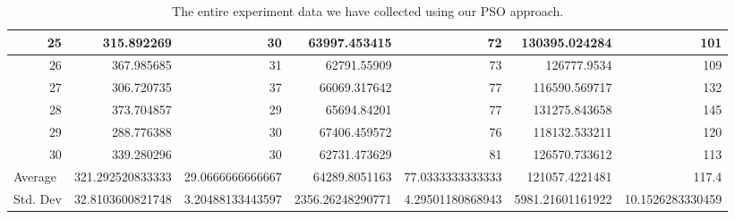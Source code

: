 \begin{table}
\begin{adjustwidth}{}{}
{{\begin{tabular}{|r|r|r|r|r|r|r|}
\hline
25                                         & 315.892269                   & 30                                    & 63997.453415                   & 72                                    & 130395.024284                & 101                                    \\ 
\hline
26                                         & 367.985685                   & 31                                    & 62791.55909                    & 73                                    & 126777.9534                  & 109                                    \\ 
\hline
27                                         & 306.720735                   & 37                                    & 66069.317642                   & 77                                    & 116590.569717                & 132                                    \\ 
\hline
28                                         & 373.704857                   & 29                                    & 65694.84201                    & 77                                    & 131275.843658                & 145                                    \\ 
\hline
29                                         & 288.776388                   & 30                                    & 67406.459572                   & 76                                    & 118132.533211                & 120                                    \\ 
\hline
30                                         & 339.280296                   & 30                                    & 62731.473629                   & 81                                    & 126570.733612                & 113                                    \\ 
\hline
\multicolumn{1}{|l|}{Average}              & 321.292520833333             & 29.0666666666667                      & 64289.8051163                  & 77.0333333333333                      & 121057.4221481               & 117.4                                  \\ 
\hline
\multicolumn{1}{|l|}{Std. Dev}             & 32.8103600821748             & 3.20488133443597                      & 2356.26248290771               & 4.29501180868943                      & 5981.21601161922             & 10.1526283330459                       \\
\hline
\end{tabular}}}
\end{adjustwidth}
\caption{The entire experiment data we have collected using our PSO approach.}
\label{full-data-pso}
\end{table}

